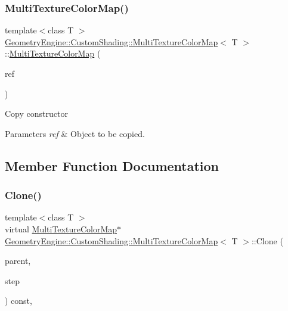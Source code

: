 \subsubsection{\texorpdfstring{MultiTextureColorMap()}{MultiTextureColorMap()}\hspace{0.1cm}{\footnotesize\ttfamily [2/2]}}
{\footnotesize\ttfamily template$<$class T $>$ \\
\mbox{\hyperlink{class_geometry_engine_1_1_custom_shading_1_1_multi_texture_color_map}{Geometry\+Engine\+::\+Custom\+Shading\+::\+Multi\+Texture\+Color\+Map}}$<$ T $>$\+::\mbox{\hyperlink{class_geometry_engine_1_1_custom_shading_1_1_multi_texture_color_map}{Multi\+Texture\+Color\+Map}} (\begin{DoxyParamCaption}\item[{const \mbox{\hyperlink{class_geometry_engine_1_1_custom_shading_1_1_custom_shading_step}{Custom\+Shading\+Step}} \&}]{ref }\end{DoxyParamCaption})\hspace{0.3cm}{\ttfamily [inline]}}

Copy constructor 
\begin{DoxyParams}{Parameters}
{\em ref} & Object to be copied. \\
\hline
\end{DoxyParams}


\subsection{Member Function Documentation}
\mbox{\label{class_geometry_engine_1_1_custom_shading_1_1_multi_texture_color_map_a74c244479b1a529cf311fea441c44159}} 
\subsubsection{\texorpdfstring{Clone()}{Clone()}}
{\footnotesize\ttfamily template$<$class T $>$ \\
virtual \mbox{\hyperlink{class_geometry_engine_1_1_custom_shading_1_1_multi_texture_color_map}{Multi\+Texture\+Color\+Map}}$\ast$ \mbox{\hyperlink{class_geometry_engine_1_1_custom_shading_1_1_multi_texture_color_map}{Geometry\+Engine\+::\+Custom\+Shading\+::\+Multi\+Texture\+Color\+Map}}$<$ T $>$\+::Clone (\begin{DoxyParamCaption}\item[{\mbox{\hyperlink{class_geometry_engine_1_1_custom_shading_1_1_custom_shading_interface}{Custom\+Shading\+Interface}} $\ast$}]{parent,  }\item[{\mbox{\hyperlink{namespace_geometry_engine_1_1_custom_shading_a2dc236a5b567da5099069ce2b2be5609}{Custom\+Shading\+Steps}}}]{step }\end{DoxyParamCaption}) const\hspace{0.3cm}{\ttfamily [inline]}, {\ttfamily [virtual]}}

